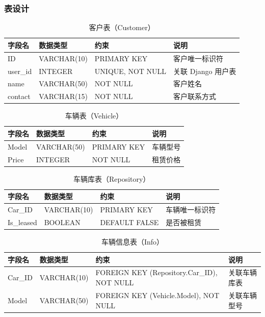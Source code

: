 \documentclass[UTF8,a4paper,12pt]{ctexart}
\begin{document}
\subsubsection{表设计}


\begin{table}[h!]
    \centering
    \caption{客户表（Customer）}
\begin{tabular}{|l|l|l|l|}
\hline
字段名 & 数据类型 & 约束 & 说明 \\
\hline
ID & VARCHAR(10) & PRIMARY KEY & 客户唯一标识符 \\
\hline
user\_id & INTEGER & UNIQUE, NOT NULL & 关联 Django 用户表 \\
\hline
name & VARCHAR(50) & NOT NULL & 客户姓名 \\
\hline
contact & VARCHAR(15) & NOT NULL & 客户联系方式 \\
\hline
\end{tabular}
\end{table}


\begin{table}[h!]
    \centering
    \caption{车辆表（Vehicle）}
\begin{tabular}{|l|l|l|l|}
\hline
字段名 & 数据类型 & 约束 & 说明 \\
\hline
Model & VARCHAR(50) & PRIMARY KEY & 车辆型号 \\
\hline
Price & INTEGER & NOT NULL & 租赁价格 \\
\hline
\end{tabular}
\end{table}


\begin{table}[h!]
    \centering
    \caption{车辆库表（Repository）}
\begin{tabular}{|l|l|l|l|}
\hline
字段名 & 数据类型 & 约束 & 说明 \\
\hline
Car\_ID & VARCHAR(10) & PRIMARY KEY & 车辆唯一标识符 \\
\hline
Is\_leased & BOOLEAN & DEFAULT FALSE & 是否被租赁 \\
\hline
\end{tabular}
\end{table}


\begin{table}[h!]
    \centering
    \caption{车辆信息表（Info）}
\begin{tabular}{|l|l|l|l|}
\hline
字段名 & 数据类型 & 约束 & 说明 \\
\hline
Car\_ID & VARCHAR(10) & FOREIGN KEY (Repository.Car\_ID), NOT NULL & 关联车辆库表 \\
\hline
Model & VARCHAR(50) & FOREIGN KEY (Vehicle.Model), NOT NULL & 关联车辆型号 \\
\hline
\end{tabular}
\end{table}
\end{document}
